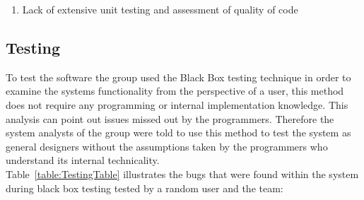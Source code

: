 \documentclass[11pt]{article}
\begin{document}
\begin{enumerate}
	\item Lack of extensive unit testing and assessment of quality of code 
\end{enumerate}

\subsection{Testing} 
To test the software the group used the Black Box testing technique in order to examine the systems functionality from the perspective of a user, this method does not require any programming or internal implementation knowledge. This analysis can point out issues missed out by the programmers. Therefore the system analysts of the group were told to use this method to test the system as general designers without the assumptions taken by the programmers who understand its internal technicality.\\
Table~\ref{table:TestingTable} illustrates the bugs that were found within the system during black box testing tested by a random user and the team:
\end{document}
